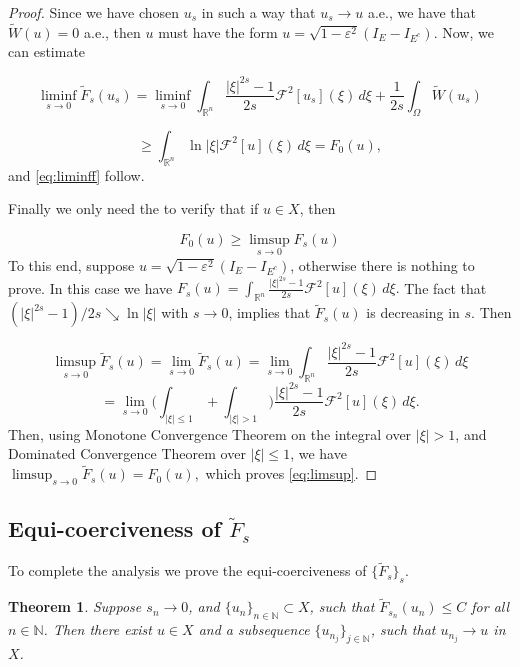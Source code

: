 \documentclass{amsart}
\newcommand{\rn}{{\mathbb{R}^n}}
\newcommand{\e}{\varepsilon}
\newcommand{\Fu}{\mathcal{F}}
\def\N{{\mathbb {N}}}
\newtheorem{theorem}{Theorem}[section]
\theoremstyle{remark}
\theoremstyle{definition}
\numberwithin{equation}{section}
\begin{document}
\begin{proof}
Since we have chosen $u_s$ in such a way that $u_s \to u$ a.e., we have that $\tilde{W}(u) = 0$ a.e., then $u$ must have the form $u = \sqrt{1 - \e^2}(I_{E} - I_{E^c}). $   
Now, we can estimate 

$$\liminf_{s \rightarrow 0} \tilde{F}_s(u_s) = \liminf_{s \to 0}{ \int_{\rn} \frac{|\xi|^{2s}-1}{2s}} \Fu^2[u_s](\xi) \, d\xi + {\frac{1}{2s}\int_{\Omega} \tilde{W}(u_s)}$$   

$$\geq \int_{\rn} \ln{|\xi|} \Fu^2[u](\xi) \, d\xi  = F_0(u),$$
and \eqref{eq:liminff} follow.

Finally we only need the to verify that if $u \in X$, then 

\begin{equation}
F_0(u) \geq \limsup_{s \to 0} F_s(u)
\label{eq:limsup}	
\end{equation}
To this end, suppose $u = \sqrt{1-\e^2}(I_{E} - I_{E^c})$, otherwise there is nothing to prove. In this case we have $F_s(u) = \int_{\rn} \frac{|\xi|^{2s} - 1}{2s}\Fu^2[u](\xi) \, d\xi. $
The fact that $(|\xi|^{2s} - 1)/2s \searrow \ln{|\xi|}$ with $s \to 0$, implies that $\tilde{F}_s(u)$ is decreasing in $s$. Then

$$ \limsup_{s \to 0} \tilde{F}_s(u) =   \lim_{s \to 0} \tilde{F}_s(u) = \lim_{s \to 0} \int_{\rn} \frac{|\xi|^{2s} - 1}{2s}\Fu^2[u](\xi) \, d\xi $$ 
$$= \lim_{s \to 0} \Big( \int_{|\xi|\leq 1} + \int_{|\xi|> 1} \Big) \frac{|\xi|^{2s} - 1}{2s}\Fu^2[u](\xi) \, d\xi. $$
Then, using Monotone Convergence Theorem on the integral over $|\xi|>1$, and Dominated Convergence Theorem over $|\xi| \leq 1$, we have $\limsup_{s \to 0} \tilde{F}_s(u) = F_0(u), $
which proves \eqref{eq:limsup}.


\end{proof}


\subsection{Equi-coerciveness of $\tilde{F}_s$} 

To complete the analysis we prove the equi-coerciveness of $\{\tilde{F}_s\}_s$.  

\begin{theorem}
Suppose $s_n \to 0$, and $\{u_n\}_{n \in \N} \subset X$, such that $\tilde{F}_{s_n}(u_n) \leq C$ for all $n \in \N$. Then there exist $u \in X$ and a subsequence $\{u_{n_j}\}_{j \in \N}$, such that $u_{n_j} \to u$ in $X$.  
\end{theorem}  
\end{document}
